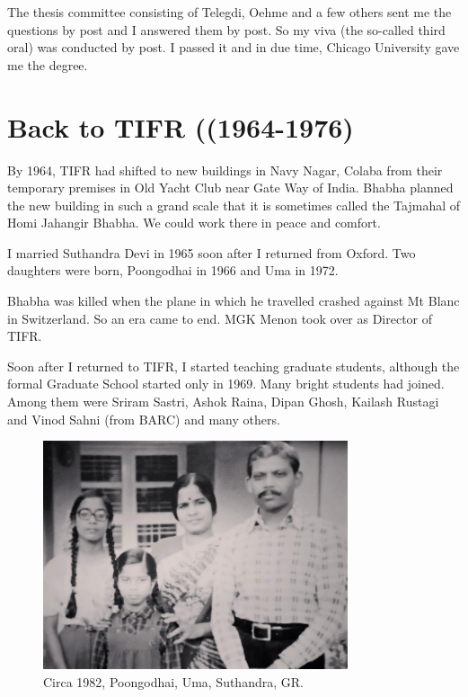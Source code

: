 The thesis committee consisting of Telegdi, Oehme and a few others sent 
me the questions by post and I answered them by post. So my viva (the 
so-called third oral) was conducted by post. I passed it and in due 
time, Chicago University gave me the degree.
\vspace{-\topsep}
\section*{Back to TIFR ((1964-1976)}

By 1964, TIFR had shifted to new buildings in Navy Nagar, Colaba from 
their temporary premises in Old Yacht Club near Gate Way of India. 
Bhabha planned the new building in such a grand scale that it is 
sometimes called the Tajmahal of Homi Jahangir Bhabha. We could work 
there in peace and comfort.

I married Suthandra Devi in 1965 soon after I 
returned from Oxford. Two daughters were born, Poongodhai in 1966 and 
Uma in 1972.

Bhabha was killed when the plane in which he travelled cra\-shed against 
Mt Blanc in Switzerland. So an era came to end. MGK Menon took over as 
Director of TIFR.

Soon after I returned to TIFR, I started teaching graduate student\-s, 
although the formal Graduate School started only in 1969. Many bright 
students had joined. Among them were Sriram Sastri, Ashok Raina, Dipan 
Ghosh, Kailash Rustagi and Vinod Sahni (from BARC) and many others.
\newpage

\begin{figure}[H]
\centering
\includegraphics[width=0.8\textwidth]{images/Rajaji-03.jpg}
\caption{\small{Circa 1982, Poongodhai, Uma, Suthandra, GR.}}
\end{figure}

